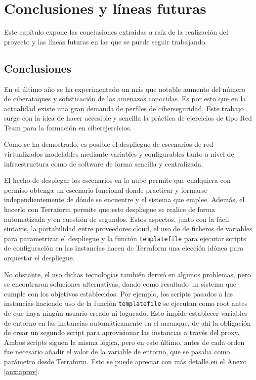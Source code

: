\chapter{Conclusiones y líneas futuras} \label{ch:con}
  Este capítulo expone las conclusiones extraidas a raíz de la realización del proyecto y las líneas futuras en las que se puede seguir trabajando.

\section{Conclusiones} \label{sec:concs}
  En el último año se ha experimentado un más que notable aumento del número de ciberataques y sofisticación de las amenazas conocidas. Es por esto que en la actualidad existe una gran demanda de perfiles de ciberseguridad. Este trabajo surge con la idea de hacer accesible y sencilla la práctica de ejercicios de tipo Red Team para la formación en ciberejercicios. 

  Como se ha demostrado, es posible el despliegue de escenarios de red virtualizados modelables mediante variables y configurables tanto a nivel de infraestructura como de software de forma sencilla y centralizada.

  El hecho de desplegar los escenarios en la nube permite que cualquiera con permiso obtenga un escenario funcional donde practicar y formarse independientemente de dónde se encuentre y el sistema que emplee. Además, el hacerlo con Terraform permite que este despliegue se realice de forma automatizada y en cuestión de segundos. Estos aspectos, junto con la fácil sintaxis, la portabilidad entre proveedores cloud, el uso de de ficheros de variables para parametrizar el despliegue y la función \texttt{templatefile} para ejecutar scripts de configuración en las instancias hacen de Terraform una elección idónea para orquestar el despliegue.

  No obstante, el uso dichas tecnologías también derivó en algunos problemas, pero se encontraron soluciones alternativas, dando como resultado un sistema que cumple con los objetivos establecidos. Por ejemplo, los scripts pasados a las instancias haciendo uso de la función \texttt{templatefile} se ejecutan como root antes de que haya ningún usuario creado ni logueado. Esto impide establecer variables de entorno en las instancias automáticamente en el arranque, de ahí la obligación de crear un segundo script para aprovisionar las instancias a través del proxy. Ambos scripts siguen la misma lógica, pero en este último, antes de cada orden fue necesario añadir el valor de la variable de entorno, que se pasaba como parámetro desde Terraform. Esto se puede apreciar con más detalle en el Anexo \ref{anx:aprov}. 

